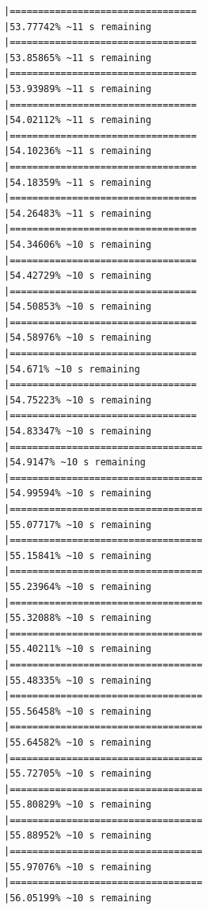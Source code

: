 \documentclass{article}\usepackage[]{graphicx}\usepackage[]{xcolor}
\makeatletter
\newenvironment{kframe}{%
 \def\at@end@of@kframe{}%
 \ifinner\ifhmode%
  \def\at@end@of@kframe{\end{minipage}}%
  \begin{minipage}{\columnwidth}%
 \fi\fi%
 \def\FrameCommand##1{\hskip\@totalleftmargin \hskip-\fboxsep
 \colorbox{shadecolor}{##1}\hskip-\fboxsep
     \hskip-\linewidth \hskip-\@totalleftmargin \hskip\columnwidth}%
 \MakeFramed {\advance\hsize-\width
   \@totalleftmargin\z@ \linewidth\hsize
   \@setminipage}}%
 {\par\unskip\endMakeFramed%
 \at@end@of@kframe}
\newenvironment{knitrout}{}{} %
\makeatother
\begin{document}
\begin{knitrout}
\begin{kframe}
\begin{verbatim}
|=================================                             |53.77742% ~11 s remaining 
|=================================                             |53.85865% ~11 s remaining 
|=================================                             |53.93989% ~11 s remaining 
|=================================                             |54.02112% ~11 s remaining 
|=================================                             |54.10236% ~11 s remaining 
|=================================                             |54.18359% ~11 s remaining 
|=================================                             |54.26483% ~11 s remaining 
|=================================                             |54.34606% ~10 s remaining 
|=================================                             |54.42729% ~10 s remaining 
|=================================                             |54.50853% ~10 s remaining 
|=================================                             |54.58976% ~10 s remaining 
|=================================                             |54.671% ~10 s remaining   
|=================================                             |54.75223% ~10 s remaining 
|=================================                             |54.83347% ~10 s remaining 
|==================================                            |54.9147% ~10 s remaining  
|==================================                            |54.99594% ~10 s remaining 
|==================================                            |55.07717% ~10 s remaining 
|==================================                            |55.15841% ~10 s remaining 
|==================================                            |55.23964% ~10 s remaining 
|==================================                            |55.32088% ~10 s remaining 
|==================================                            |55.40211% ~10 s remaining 
|==================================                            |55.48335% ~10 s remaining 
|==================================                            |55.56458% ~10 s remaining 
|==================================                            |55.64582% ~10 s remaining 
|==================================                            |55.72705% ~10 s remaining 
|==================================                            |55.80829% ~10 s remaining 
|==================================                            |55.88952% ~10 s remaining 
|==================================                            |55.97076% ~10 s remaining 
|==================================                            |56.05199% ~10 s remaining 

\end{verbatim}
\end{kframe}
\end{knitrout}
\end{document}
